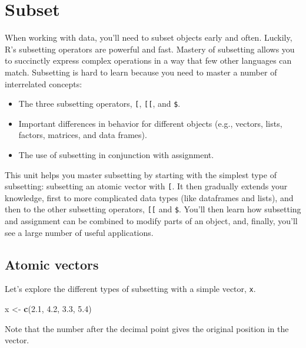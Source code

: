 \documentclass[
]{book}
\newenvironment{Shaded}{\begin{snugshade}}{\end{snugshade}}
\newcommand{\FloatTok}[1]{\textcolor[rgb]{0.00,0.00,0.81}{#1}}
\newcommand{\KeywordTok}[1]{\textcolor[rgb]{0.13,0.29,0.53}{\textbf{#1}}}
\newcommand{\NormalTok}[1]{#1}
\newcommand{\StringTok}[1]{\textcolor[rgb]{0.31,0.60,0.02}{#1}}
\begin{document}
\hypertarget{subset}{%
\section{Subset}\label{subset}}

When working with data, you'll need to subset objects early and often. Luckily, R's subsetting operators are powerful and fast. Mastery of subsetting allows you to succinctly express complex operations in a way that few other languages can match. Subsetting is hard to learn because you need to master a number of interrelated concepts:

\begin{itemize}
\item
  The three subsetting operators, \texttt{{[}}, \texttt{{[}{[}}, and \texttt{\$}.
\item
  Important differences in behavior for different objects (e.g., vectors, lists, factors, matrices, and data frames).
\item
  The use of subsetting in conjunction with assignment.
\end{itemize}

This unit helps you master subsetting by starting with the simplest type of subsetting: subsetting an atomic vector with \texttt{{[}}. It then gradually extends your knowledge, first to more complicated data types (like dataframes and lists), and then to the other subsetting operators, \texttt{{[}{[}} and \texttt{\$}. You'll then learn how subsetting and assignment can be combined to modify parts of an object, and, finally, you'll see a large number of useful applications.

\hypertarget{atomic-vectors}{%
\subsection{Atomic vectors}\label{atomic-vectors}}

Let's explore the different types of subsetting with a simple vector, \texttt{x}.

\begin{Shaded}
\begin{Highlighting}[]
\NormalTok{x \textless{}{-}}\StringTok{ }\KeywordTok{c}\NormalTok{(}\FloatTok{2.1}\NormalTok{, }\FloatTok{4.2}\NormalTok{, }\FloatTok{3.3}\NormalTok{, }\FloatTok{5.4}\NormalTok{)}
\end{Highlighting}
\end{Shaded}

Note that the number after the decimal point gives the original position in the vector.
\end{document}
